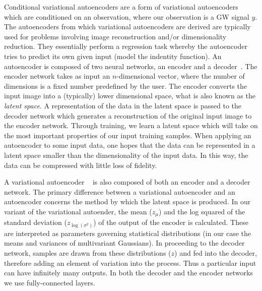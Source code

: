 \documentclass[%
showpacs,
 amsmath,amssymb,
 aps,
 twocolumn,
 prl,
 reprint,
floatfix,
]{revtex4-1}
\begin{document}
%
%
Conditional variational autoencoders are a form of variational autoencoders
which are conditioned on an observation, where our observation is a 
\ac{GW} signal $y$. The autoencoders from which variational
autoencoders are derived are typically used for problems involving image
reconstruction and/or dimensionality reduction. They essentially perform 
a regression task whereby the autoencoder tries to predict its own given input (model the 
indentity function). An autoencoder is composed of two neural
networks, an encoder and a decoder~\cite{LIOU20083150}.  The encoder network
takes as input an $n$-dimensional vector, where the number of dimensions is 
a fixed number predefined by the user. The encoder converts 
the input image into a (typically) lower
dimensional space, what is also known as the {\it{latent space}}. A 
representation of the data in the latent space is passed to 
the decoder network which generates a
reconstruction of the original input image to the encoder network. Through
training, we learn a latent space which will take on the most important properties of our input training
samples. When applying an autoencoder to some input data, 
one hopes that the data can be represented in a latent 
space smaller than the dimensionality of the input data. 
In this way, the data can be compressed with little loss of fidelity.  

%
%
A variational autoencoder ~\cite{1812.04405} is also composed of both an
encoder and a decoder network. The primary difference between a variational
autoencoder and an autoencoder concerns the method by which the latent space is
produced. In our variant of the variational autoender, the mean ($z_{\mu}$) and
the log squared of the standard deviation ($z_{\log{(\sigma^{2})}}$) of the
output of the encoder is calculated. These are interpreted as parameters 
governing statistical distributions (in our case the means and variances of 
multivariant Gaussians). In proceeding to the decoder network, 
samples are drawn from these distributions ($z$) and fed 
into the decoder, therefore adding an element of variation into the process. 
Thus a particular input can have infinitely many outputs. In both the 
decoder and the encoder networks we use fully-connected layers.
\end{document}
